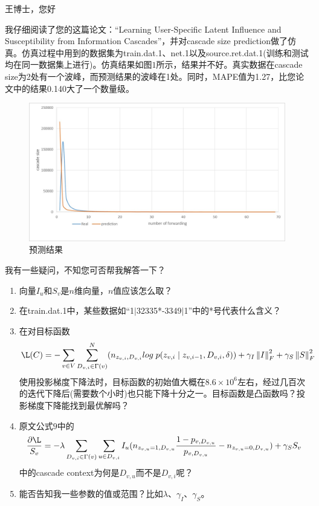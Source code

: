 \documentclass[UTF8]{ctexart}
\begin{document}
\par 王博士，您好
\newline
\par 我仔细阅读了您的这篇论文：“Learning User-Specific Latent Influence and
Susceptibility from Information Cascades”，并对cascade size prediction做了仿真。仿真过程中用到的数据集为train.dat.1、net.1以及source.ret.dat.1(训练和测试均在同一数据集上进行)。仿真结果如图$1$所示，结果并不好。真实数据在cascade size为2处有一个波峰，而预测结果的波峰在1处。同时，MAPE值为1.27，比您论文中的结果0.140大了一个数量级。
\begin{figure}[h!]
    \centering
    \includegraphics[width=12cm]{cascade.jpg}
    \caption{预测结果}
    \label{fig-sample}
\end{figure}
\par 我有一些疑问，不知您可否帮我解答一下？
\begin{enumerate}[\indent (1)]
    \item 向量$I_{u}$和$S_{v}$是$n$维向量，$n$值应该怎么取？
    \item 在train.dat.1中，某些数据如“1$|$32335*-3349$|$1”中的*号代表什么含义？
    \item 在对目标函数$$\L (C) = -\sum _{v \in V}\sum _{D_{v,i}\in \Gamma (v)}^{N}(n_{z_{v,i},D_{v,i}}log \; p(z_{v,i}\mid z_{v,i-1}, D_{v,i},\delta)) + \gamma _{I}\left \| I \right \|_{F}^{2}+\gamma _{S}\left \| S \right \|_{F}^{2}$$使用投影梯度下降法时，目标函数的初始值大概在$8.6\times 10^{6}$左右，经过几百次的迭代下降后(需要数个小时)也只能下降十分之一。目标函数是凸函数吗？投影梯度下降能找到最优解吗？
    \item 原文公式$9$中的$$\frac{\partial \L}{S_{v}}=-\lambda \sum _{D_{v,i}\in \Gamma (v)}\sum _{u \in D_{v,i}} I _{u}(n_{z_{v,u}=1,D_{v,u}}\frac{1-p_{v,D_{v,u}}}{p_{v,D_{v,u}}}-n_{z_{v,u}=0,D_{v,u}})+\gamma _{S}S_{v} $$中的cascade context为何是$D_{v,u}$而不是$D_{v,i}$呢？
    \item 能否告知我一些参数的值或范围？比如$\lambda$、$\gamma _{I}$、$\gamma _{S}$。
\end{enumerate}
\end{document}
